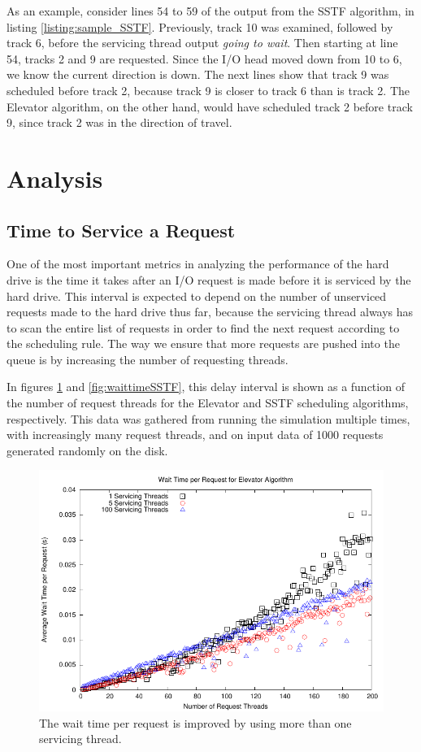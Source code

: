 \documentclass{report}
\begin{document}
As an example, consider lines 54 to 59 of the output from the SSTF algorithm, in listing
\ref{listing:sample_SSTF}. Previously, track 10 was examined, followed by track 6, before
the servicing thread output \emph{going to wait}. Then starting at line 54, tracks 2 and 9
are requested. Since the I/O head moved down from 10 to 6, we know the current direction is
down. The next lines show that track 9 was scheduled before track 2, because track 9 is
closer to track 6 than is track 2. The Elevator algorithm, on the other hand, would have
scheduled track 2 before track 9, since track 2 was in the direction of travel.

\newpage
\section{Analysis} %
\subsection{Time to Service a Request}
One of the most important metrics in analyzing the performance of the hard drive is the
time it takes after an I/O request is made before it is serviced by the hard drive. This
interval is expected to depend on the number of unserviced requests made to the hard drive
thus far, because the servicing thread always has to scan the entire list of requests in
order to find the next request according to the scheduling rule. The way we ensure that
more requests are pushed into the queue is by increasing the number of requesting threads.

In figures
\ref{fig:waittimeElevator} and \ref{fig:waittimeSSTF}, this delay interval is shown as a 
function of the number of request threads for the Elevator and SSTF scheduling algorithms,
respectively.
This data was gathered from running the simulation multiple times, with increasingly many
request threads, and on input data of 1000 requests generated randomly on the disk.

\begin{figure}[htb!]
    \centering
    \includegraphics[scale=1]{waittimeElevator.pdf}
    \caption{The wait time per request is improved by using more than one servicing thread.}
    \label{fig:waittimeElevator}
\end{figure}
\end{document}
